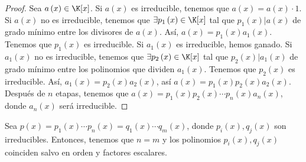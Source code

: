 \begin{proof}
	Sea $\displaystyle a\left(x\right) \in \K[x] $. Si $\displaystyle a\left(x\right) $ es irreducible, tenemos que $\displaystyle a\left(x\right) = a\left(x\right) \cdot 1 $. Si $\displaystyle a\left(x\right) $ no es irreducible, tenemos que $\displaystyle \exists p_{1}\left(x\right) \in \K[x] $ tal que $\displaystyle p_{1}\left(x\right) | a\left(x\right) $ de grado mínimo entre los divisores de $\displaystyle a\left(x\right) $. Así, $\displaystyle a\left(x\right) = p_{1}\left(x\right)a_{1}\left(x\right) $. Tenemos que $\displaystyle p_{1}\left(x\right) $ es irreducible. Si $\displaystyle a_{1}\left(x\right) $ es irreducible, hemos ganado.
	Si $\displaystyle a_{1}\left(x\right) $ no es irreducible, tenemos que $\displaystyle \exists p_{2}\left(x\right) \in \K[x] $ tal que $\displaystyle p_{2}\left(x\right) | a_{1}\left(x\right) $ de grado mínimo entre los polinomios que dividen $\displaystyle a_{1}\left(x\right) $. Tenemos que $\displaystyle p_{2}\left(x\right) $ es irreducible. Así, $\displaystyle a_{1}\left(x\right) = p_{2}\left(x\right)a_{2}\left(x\right) $, así $\displaystyle a\left(x\right) = p_{1}\left(x\right)p_{2}\left(x\right)a_{2}\left(x\right) $.
Después de $\displaystyle n $ etapas, tenemos que $\displaystyle a\left(x\right) = p_{1}\left(x\right)p_{2}\left(x\right) \cdots p_{n}\left(x\right)a_{n}\left(x\right) $, donde $\displaystyle a_{n}\left(x\right) $ será irreducible.
\end{proof}
\begin{fprop}[]
\normalfont Sea $\displaystyle p\left(x\right) = p_{1}\left(x\right) \cdots p_{n}\left(x\right) = q_{1}\left(x\right) \cdots q_{m}\left(x\right)$, donde $\displaystyle p_{i}\left(x\right), q_{j}\left(x\right) $ son irreducibles. Entonces, tenemos que $\displaystyle n = m $ y los polinomios $\displaystyle p_{i}\left(x\right), q_{j}\left(x\right) $ coinciden salvo en orden y factores escalares.
\end{fprop}
